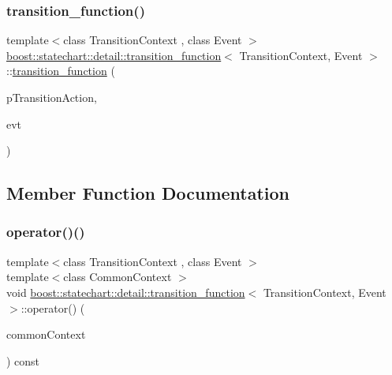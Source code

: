 \subsubsection{\texorpdfstring{transition\+\_\+function()}{transition\_function()}}
{\footnotesize\ttfamily template$<$class Transition\+Context , class Event $>$ \\
\mbox{\hyperlink{classboost_1_1statechart_1_1detail_1_1transition__function}{boost\+::statechart\+::detail\+::transition\+\_\+function}}$<$ Transition\+Context, Event $>$\+::\mbox{\hyperlink{classboost_1_1statechart_1_1detail_1_1transition__function}{transition\+\_\+function}} (\begin{DoxyParamCaption}\item[{void(Transition\+Context\+::$\ast$)(const Event \&)}]{p\+Transition\+Action,  }\item[{const Event \&}]{evt }\end{DoxyParamCaption})\hspace{0.3cm}{\ttfamily [inline]}}



\subsection{Member Function Documentation}
\mbox{\label{classboost_1_1statechart_1_1detail_1_1transition__function_a866274b524d0cce2ba4bafc22d49d985}} 
\subsubsection{\texorpdfstring{operator()()}{operator()()}}
{\footnotesize\ttfamily template$<$class Transition\+Context , class Event $>$ \\
template$<$class Common\+Context $>$ \\
void \mbox{\hyperlink{classboost_1_1statechart_1_1detail_1_1transition__function}{boost\+::statechart\+::detail\+::transition\+\_\+function}}$<$ Transition\+Context, Event $>$\+::operator() (\begin{DoxyParamCaption}\item[{Common\+Context \&}]{common\+Context }\end{DoxyParamCaption}) const\hspace{0.3cm}{\ttfamily [inline]}}

